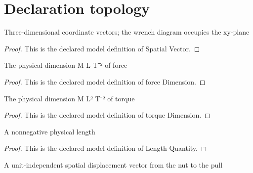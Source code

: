 \section{Declaration topology}
\begin{definition}
  \label{def:physics:phyx-mini-0701:phyxminiproblems-problemphyxmini0701-spatialvector}
  Three-dimensional coordinate vectors; the wrench diagram occupies the xy-plane
\end{definition}
\begin{proof}
  This is the declared model definition of Spatial Vector.
\end{proof}
\begin{definition}
  \label{def:physics:phyx-mini-0701:phyxminiproblems-problemphyxmini0701-forcedimension}
  The physical dimension M L T⁻² of force
\end{definition}
\begin{proof}
  This is the declared model definition of force Dimension.
\end{proof}
\begin{definition}
  \label{def:physics:phyx-mini-0701:phyxminiproblems-problemphyxmini0701-torquedimension}
  The physical dimension M L² T⁻² of torque
\end{definition}
\begin{proof}
  This is the declared model definition of torque Dimension.
\end{proof}
\begin{definition}
  \label{def:physics:phyx-mini-0701:phyxminiproblems-problemphyxmini0701-lengthquantity}
  A nonnegative physical length
\end{definition}
\begin{proof}
  This is the declared model definition of Length Quantity.
\end{proof}
\begin{definition}
  \label{def:physics:phyx-mini-0701:phyxminiproblems-problemphyxmini0701-displacementvectorquantity}
  A unit-independent spatial displacement vector from the nut to the pull
\end{definition}
